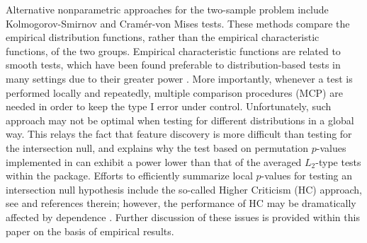 Alternative nonparametric approaches for the two-sample problem include Kolmogorov-Smirnov and Cramér-von Mises tests. These methods compare the empirical distribution functions, rather than the empirical characteristic functions, of the two groups. Empirical characteristic functions are related to smooth tests, which have been found preferable to distribution-based tests in many settings due to their greater power \citep{MCdUA2009}. More importantly, whenever a test is performed locally and repeatedly, multiple comparison procedures (MCP) are needed in order to keep the type I error under control. Unfortunately, such approach may not be optimal when testing for different distributions in a global way. This relays the fact that feature discovery is more difficult than testing for the intersection null, and explains why the test based on permutation $p$-values implemented in  can exhibit a power lower than that of the averaged $L_2$-type tests within the package. Efforts to efficiently summarize local $p$-values for testing an intersection null hypothesis include the so-called Higher Criticism (HC) approach, see \cite{Zhangetal2020} and references therein; however, the performance of HC may be dramatically affected by dependence \citep{HallJin2008}. Further discussion of these issues is provided within this paper on the basis of empirical results. 







